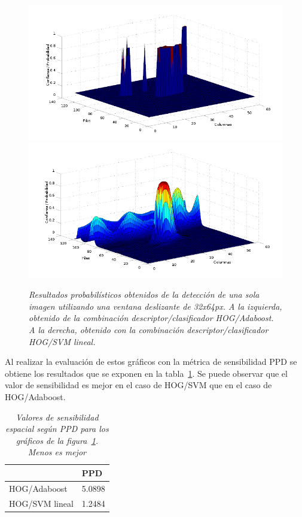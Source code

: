\begin{figure}[H]
  \centering
  \includegraphics[scale=.25]{images/sig/boost/prueba}
  \includegraphics[scale=.25]{images/sig/svm/prueba}
  \caption{\em  Resultados probabilísticos obtenidos de la detección de una sola imagen utilizando una ventana deslizante de 32x64px. A la izquierda, obtenido de la combinación descriptor/clasificador HOG/Adaboost. A la derecha, obtenido con la combinación descriptor/clasificador HOG/SVM lineal.}  
  \label{fig:prueba2}
\end{figure}

Al realizar la evaluación de estos gráficos con la métrica de sensibilidad PPD se obtiene los resultados que se exponen en la tabla~\ref{tab:resp2}. Se puede observar que el valor de sensibilidad es mejor en el caso de HOG/SVM que en el caso de HOG/Adaboost.

\begin{table}[H]
\centering
 \caption{\em  Valores de sensibilidad espacial según PPD para los gráficos de la figura~\ref{fig:prueba2}. Menos es mejor}  
  \label{tab:resp2}
\begin{tabular}{l|l|}
\cline{2-2}
                                      & PPD     \\ \hline
\multicolumn{1}{|l|}{HOG/Adaboost}    & 5.0898 \\ \hline
\multicolumn{1}{|l|}{HOG/SVM lineal} &  1.2484 \\ \hline
\end{tabular}
\end{table}

